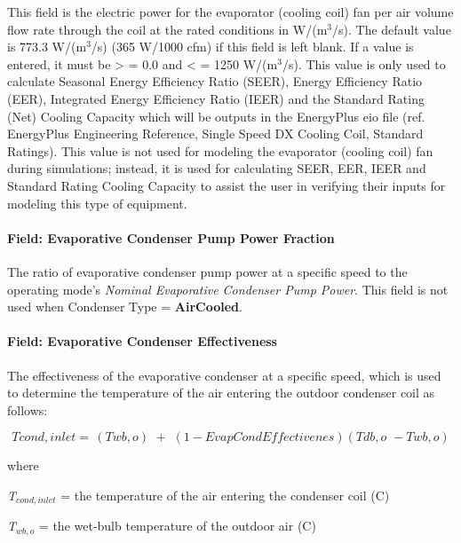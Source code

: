 This field is the electric power for the evaporator (cooling coil) fan per air volume flow rate through the coil at the rated conditions in W/(m\(^{3}\)/s). The default value is 773.3 W/(m\(^{3}\)/s) (365 W/1000 cfm) if this field is left blank. If a value is entered, it must be \textgreater{} = 0.0 and \textless{} = 1250 W/(m\(^{3}\)/s). This value is only used to calculate Seasonal Energy Efficiency Ratio (SEER), Energy Efficiency Ratio (EER), Integrated Energy Efficiency Ratio (IEER) and the Standard Rating (Net) Cooling Capacity which will be outputs in the EnergyPlus eio file (ref. EnergyPlus Engineering Reference, Single Speed DX Cooling Coil, Standard Ratings). This value is not used for modeling the evaporator (cooling coil) fan during simulations; instead, it is used for calculating SEER, EER, IEER and Standard Rating Cooling Capacity to assist the user in verifying their inputs for modeling this type of equipment.

\paragraph{Field: Evaporative Condenser Pump Power Fraction}\label{field-evaporative-condenser-pump-power-fraction}

The ratio of evaporative condenser pump power at a specific speed to the operating mode's \textit{Nominal Evaporative Condenser Pump Power}. This field is not used when Condenser Type = \textbf{AirCooled}.

\paragraph{Field: Evaporative Condenser Effectiveness}\label{field-evaporative-condenser-effectiveness}

The effectiveness of the evaporative condenser at a specific speed, which is used to determine the temperature of the air entering the outdoor condenser coil as follows:

\begin{equation}
Tcond,inlet = \,\left( {Twb,o} \right)\,\, + \,\,\left( {1 - EvapCondEffectivenes} \right)\left( {Tdb,o\,\, - Twb,o} \right)
\end{equation}

where

\emph{T\(_{cond,inlet}\)} = the temperature of the air entering the condenser coil (C)

\emph{T\(_{wb,o}\)} = the wet-bulb temperature of the outdoor air (C)


